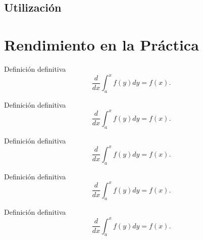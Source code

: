 \subsection{Utilización}

\section{Rendimiento en la Práctica}

\begin{defn} Definición definitiva $$\frac{d}{dx}\int_a^xf(y)dy=f(x).$$\end{defn}

\begin{teo} Definición definitiva $$\frac{d}{dx}\int_a^xf(y)dy=f(x).$$\end{teo}

\begin{prop} Definición definitiva $$\frac{d}{dx}\int_a^xf(y)dy=f(x).$$\end{prop}

\begin{obs} Definición definitiva $$\frac{d}{dx}\int_a^xf(y)dy=f(x).$$\end{obs}

\begin{ej} Definición definitiva $$\frac{d}{dx}\int_a^xf(y)dy=f(x).$$\end{ej}